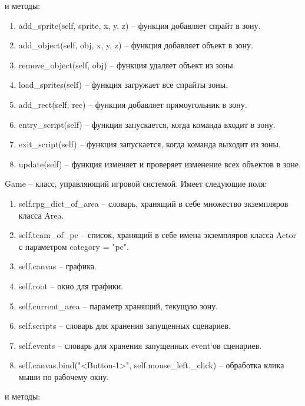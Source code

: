 		и методы:
		\begin{enumerate}
			\item add\_sprite(self, sprite, x, y, z) -- функция добавляет спрайт в зону.
			\item add\_object(self, obj, x, y, z) -- функция добавляет объект в зону.
			\item remove\_object(self, obj) -- функция удаляет объект из зоны.
			\item load\_sprites(self) -- функция загружает все спрайты зоны.
			\item add\_rect(self, rec) -- функция добавляет прямоугольник в зону.
			\item entry\_script(self) -- функция запускается, когда команда входит в зону.
			\item exit\_script(self) -- функция запускается, когда команда выходит из зоны.
			\item update(self) -- функция изменяет и проверяет изменение всех объектов в зоне.
		\end{enumerate}
	Game -- класс, управляющий игровой системой. Имеет следующие поля:
		\begin{enumerate}
			\item self.rpg\_dict\_of\_area -- словарь, хранящий в себе множество экземпляров класса Area.
			\item self.team\_of\_pc -- список, хранящий в себе имена экземпляров класса Actor с параметром category = "pc".
			\item self.canvas -- графика.
			\item self.root -- окно для графики.
			\item self.current\_area -- параметр хранящий, текущую зону.
			\item self.scripts -- словарь для хранения запущенных сценариев.
			\item self.events -- словарь для хранения запущенных event`ов сценариев.
			\item self.canvas.bind("<Button-1>", self.mouse\_left.\_click) -- обработка клика мыши по рабочему окну.
		\end{enumerate}
		и методы:
